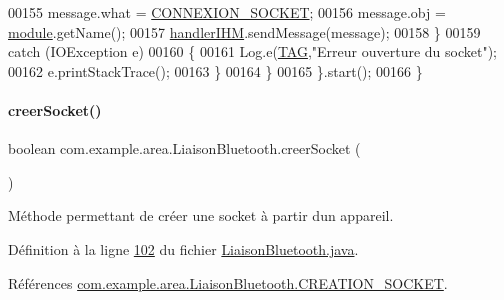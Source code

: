 \begin{DoxyCode}
00155                     message.what = \hyperlink{classcom_1_1example_1_1area_1_1_liaison_bluetooth_a4870b4fac5c0f1aedac1bb40346d43da}{CONNEXION\_SOCKET};
00156                     message.obj = \hyperlink{classcom_1_1example_1_1area_1_1_liaison_bluetooth_a80068a7178f6c84eae7bab50cf0a784a}{module}.getName();
00157                     \hyperlink{classcom_1_1example_1_1area_1_1_liaison_bluetooth_ace2c20759fc96d3ae787f1f726fd2691}{handlerIHM}.sendMessage(message);
00158                 \}
00159                 \textcolor{keywordflow}{catch} (IOException e)
00160                 \{
00161                     Log.e(\hyperlink{classcom_1_1example_1_1area_1_1_liaison_bluetooth_ac51aa4b63fae5c36734a061cc05d7fc9}{TAG},\textcolor{stringliteral}{"Erreur ouverture du socket"});
00162                     e.printStackTrace();
00163                 \}
00164             \}
00165         \}.start();
00166     \}
\end{DoxyCode}
\mbox{\label{classcom_1_1example_1_1area_1_1_liaison_bluetooth_a69ea46dca5a0690d5d8231731ae60d9f}} 
\paragraph{\texorpdfstring{creer\+Socket()}{creerSocket()}}
{\footnotesize\ttfamily boolean com.\+example.\+area.\+Liaison\+Bluetooth.\+creer\+Socket (\begin{DoxyParamCaption}{ }\end{DoxyParamCaption})\hspace{0.3cm}{\ttfamily [private]}}



Méthode permettant de créer une socket à partir d\textquotesingle{}un appareil. 



Définition à la ligne \hyperlink{_liaison_bluetooth_8java_source_l00102}{102} du fichier \hyperlink{_liaison_bluetooth_8java_source}{Liaison\+Bluetooth.\+java}.



Références \hyperlink{_liaison_bluetooth_8java_source_l00035}{com.\+example.\+area.\+Liaison\+Bluetooth.\+C\+R\+E\+A\+T\+I\+O\+N\+\_\+\+S\+O\+C\+K\+ET}.



